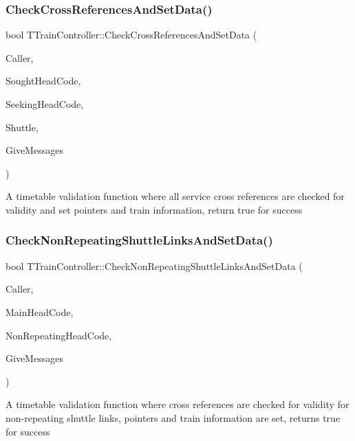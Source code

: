\subsubsection{\texorpdfstring{Check\+Cross\+References\+And\+Set\+Data()}{CheckCrossReferencesAndSetData()}}
{\footnotesize\ttfamily bool T\+Train\+Controller\+::\+Check\+Cross\+References\+And\+Set\+Data (\begin{DoxyParamCaption}\item[{int}]{Caller,  }\item[{Ansi\+String}]{Sought\+Head\+Code,  }\item[{Ansi\+String}]{Seeking\+Head\+Code,  }\item[{bool}]{Shuttle,  }\item[{bool}]{Give\+Messages }\end{DoxyParamCaption})}

A timetable validation function where all service cross references are checked for validity and set pointers and train information, return true for success \mbox{\label{class_t_train_controller_aa991976bc8ea956f9e9230f6a6921ac1}} 
\subsubsection{\texorpdfstring{Check\+Non\+Repeating\+Shuttle\+Links\+And\+Set\+Data()}{CheckNonRepeatingShuttleLinksAndSetData()}}
{\footnotesize\ttfamily bool T\+Train\+Controller\+::\+Check\+Non\+Repeating\+Shuttle\+Links\+And\+Set\+Data (\begin{DoxyParamCaption}\item[{int}]{Caller,  }\item[{Ansi\+String}]{Main\+Head\+Code,  }\item[{Ansi\+String}]{Non\+Repeating\+Head\+Code,  }\item[{bool}]{Give\+Messages }\end{DoxyParamCaption})}

A timetable validation function where cross references are checked for validity for non-\/repeating shuttle links, pointers and train information are set, returns true for success \mbox{\label{class_t_train_controller_a45168500acc985a1573602e0c00a0d9a}} 
